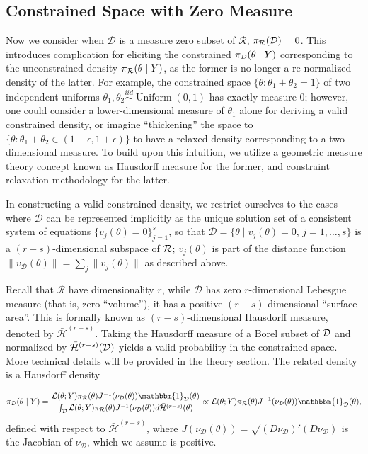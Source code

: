 \documentclass[10pt,fleqn]{article}
\DeclareMathOperator{\U}{Uniform} \DeclareMathOperator{\Poi}{Poisson}
\DeclareMathOperator{\1}{\mathbbm{1}} \DeclareMathOperator{\bigO}{\mc O}
\begin{document}
\subsection{Constrained Space with Zero Measure}
\label{SEC:Zero_Measure_Methods}

Now we consider when $\mathcal{D}$
is a measure zero subset of $\mathcal{R}$, $\pi_{\mathcal{R}}(\mathcal{D})=0$. This introduces complication for eliciting the constrained $\pi_{\mathcal{D}}(\theta \mid Y)$ corresponding to the unconstrained density $\pi_{\mathcal{R}}(\theta \mid Y) $, as the former is no longer a re-normalized density of the latter.  For example, the constrained space $\{\theta: \theta_1+\theta_2=1\}$ of two independent uniforms $\theta_1, \theta_2 \stackrel{iid}{\sim} \U(0,1)$ has exactly measure $0$;  however, one could consider a lower-dimensional measure of $\theta_1$ alone for deriving a valid constrained density, or imagine ``thickening'' the space to $\{\theta: \theta_1+\theta_2\in (1-\epsilon,1+\epsilon)\}$ to have a relaxed density corresponding to a two-dimensional measure. To build upon this intuition, we utilize a geometric measure theory concept known as Hausdorff measure for the former, and constraint relaxation methodology for the latter.

In constructing a valid constrained density, we restrict
ourselves to the cases where $\mathcal{D}$ can be represented implicitly
as the unique solution set of a consistent system of equations $\{v_j(\theta) =
0\}_{j=1}^s$, so that $\mathcal{D} =\{\theta \mid v_j(\theta) =0, \, j =
1, \dots,s\}$ is a $(r-s)$-dimensional subspace of $\mathcal{R}$; $v_j(\theta)$ is part of the distance function $\|v_\mathcal{D}(\theta)\|=\sum_j \| v_j(\theta)\|$ as described above. 

Recall that $\mathcal{R}$ have dimensionality $r$, while $\mathcal{D}$ has zero $r$-dimensional Lebesgue measure (that is, zero ``volume''), it has a positive
$(r-s)$-dimensional ``surface area''. This is formally known as $(r-s)$-dimensional Hausdorff measure, denoted by $\bar{\mathcal{H}}^{(r-s)}$. Taking the Hausdorff measure of a Borel subset of $\mathcal{D}$ and normalized by $\bar{\mathcal{H}}^{(r-s)}(\mathcal{D})$ yields a valid probability in the constrained space. More technical details will be provided in the theory section. The related density is a Hausdorff density


$$\pi_{\mc D}(\theta \mid Y) = \dfrac{
{\mathcal{L}(\theta;Y)\pi_\mathcal{R}(\theta)}{J^{-1}(\nu_\mathcal{D}(\theta))
\mathbbm{1}_{\mc D}(\theta)
}
} {\int_\mathcal{D}
{\mathcal{L}(\theta;Y)\pi_\mathcal{R}(\theta)}{J^{-1}(\nu_\mathcal{D}(\theta))}
d\bar{\mathcal{H}}^{(r-s)}(\theta)} \propto
{\mathcal{L}(\theta;Y)\pi_\mathcal{R}(\theta)}{J^{-1}(\nu_\mathcal{D}(\theta))
\mathbbm{1}_{\mc D}(\theta)
},
$$
defined with respect to $\bar{\mathcal{H}}^{(r-s)}$, where $J(\nu_\mathcal{D}(\theta)) =
\sqrt{(D\nu_\mathcal{D})'(D\nu_\mathcal{D})}$ is the Jacobian
of $\nu_\mathcal{D}$, which we assume is positive.
\end{document}
